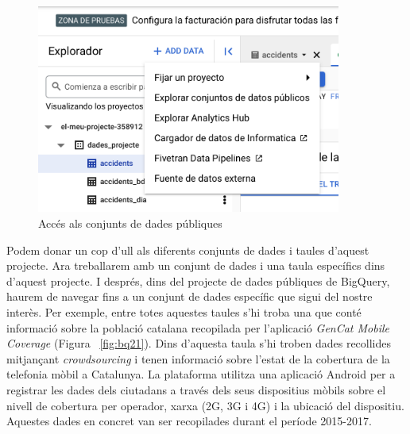 \documentclass[12pt,longbibliography]{article}
\theoremstyle{definition}
\theoremstyle{remark}
\begin{document}
\vspace{2mm}
\begin{figure}[h!]
\begin{center}
\includegraphics[width=10cm]{bq20}
\end{center}
\caption{Accés als conjunts de dades públiques}
\label{fig:bq20}
\end{figure}
\vspace{2mm}

Podem donar un cop d'ull als diferents conjunts de dades i taules d'aquest projecte. Ara treballarem amb un conjunt de dades i una taula específics dins d'aquest projecte. I després, dins del projecte de dades públiques de BigQuery, haurem de navegar fins a un conjunt de dades específic que sigui del nostre interès. Per exemple, entre totes aquestes taules s'hi troba una que conté informació sobre la població catalana recopilada per l'aplicació \textit{GenCat Mobile Coverage} (Figura ~\ref{fig:bq21}). Dins d'aquesta taula s'hi troben dades recollides mitjançant \textit{crowdsourcing} i tenen informació sobre l'estat de la cobertura de la telefonia mòbil a Catalunya. La plataforma utilitza una aplicació Android per a registrar les dades dels ciutadans a través dels seus dispositius mòbils sobre el nivell de cobertura per operador, xarxa (2G, 3G i 4G) i la ubicació del dispositiu. Aquestes dades en concret van ser recopilades durant el període 2015-2017.
\end{document}
